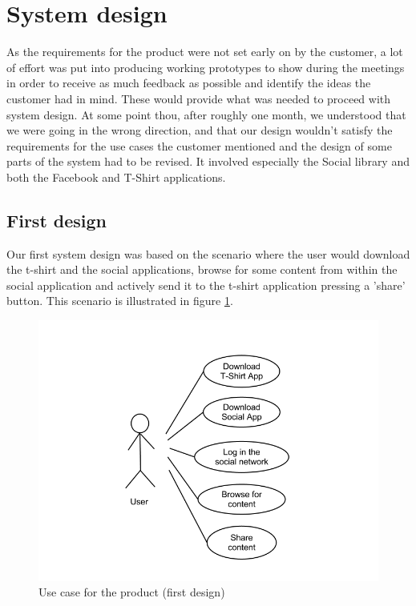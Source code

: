 \section{System design}
\label{sec:system-design}
As the requirements for the product were not set early on by the customer, a lot of effort
was put into producing working prototypes to show during the meetings in order to receive
as much feedback as possible and identify the ideas the customer had in mind.
These would provide what was needed to proceed with system design.
At some point thou, after roughly one month, we understood that we were going in the wrong direction,
and that our design wouldn't satisfy the requirements for the use cases the customer mentioned and the
design of some parts of the system had to be revised. It involved especially the Social library and both
the Facebook and T-Shirt applications.

\subsection{First design}
Our first system design was based on the scenario where the user would download the t-shirt
and the social applications, browse for some content from within the social application
and actively send it to the t-shirt application pressing a 'share' button.
This scenario is illustrated in figure \ref{fig:design-usecase1}.

\begin{figure}[h!]
	\centering \includegraphics[scale=0.35]{img/design-usecase1}
	\caption{Use case for the product (first design)}
	\label{fig:design-usecase1}
\end{figure}

